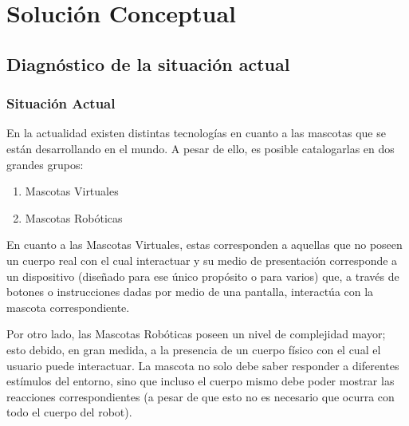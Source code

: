 \chapter{Soluci\'on Conceptual}
\newpage
\section{Diagn\'ostico de la situaci\'on actual}
\subsection{Situaci\'on Actual}

En la actualidad existen distintas tecnolog\'ias en cuanto a las mascotas que se est\'an de\-sa\-rro\-llan\-do en el mundo. A pesar de ello, es posible catalogarlas en dos grandes grupos:

\begin{enumerate}
\item Mascotas Virtuales
\item Mascotas Rob\'oticas
\end{enumerate}

En cuanto a las Mascotas Virtuales, estas corresponden a aquellas que no poseen un cuerpo real con el cual interactuar y su medio de presentaci\'on corresponde a un dispositivo (dise\~nado para ese \'unico prop\'osito o para varios) que, a trav\'es de botones o instrucciones dadas por medio de una pantalla, interact\'ua con la mascota correspondiente.

Por otro lado, las Mascotas Rob\'oticas poseen un nivel de complejidad mayor; esto debido, en gran medida, a la presencia de un cuerpo f\'isico con el cual el usuario puede interactuar. La mascota no solo debe saber responder a diferentes est\'imulos del entorno, sino que incluso el cuerpo mismo debe poder mostrar las reacciones correspondientes (a pesar de que esto no es necesario que ocurra con todo el cuerpo del robot).

